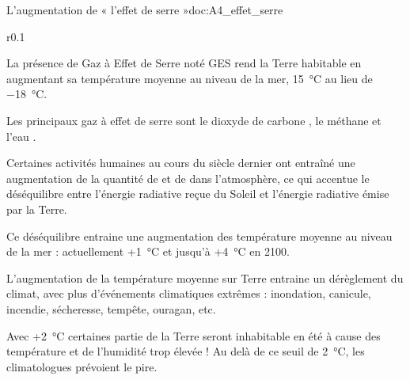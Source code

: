 \begin{doc}{L'augmentation de « l'effet de serre »}{doc:A4_effet_serre}
  \begin{wrapfigure}[3]{r}{0.1\linewidth}
    \vspace*{-18pt}
  \end{wrapfigure}
  La présence de Gaz à Effet de Serre noté GES rend la Terre habitable en augmentant sa température moyenne au niveau de la mer, \qty{15}{\degreeCelsius} au lieu de \qty{-18}{\degreeCelsius}.

  \begin{importants}  
    Les principaux gaz à effet de serre sont le dioxyde de carbone ,
    le méthane  et l'eau .
  \end{importants}

  Certaines activités humaines au cours du siècle dernier ont entraîné une augmentation de la quantité de  et de  dans l'atmosphère, ce qui accentue le déséquilibre entre l'énergie radiative reçue du Soleil et l'énergie radiative émise par la Terre.

  Ce déséquilibre entraine une augmentation des température moyenne au niveau de la mer : actuellement +\qty{1}{\degreeCelsius} et jusqu'à +\qty{4}{\degreeCelsius} en 2100.

  \begin{importants}
    L'augmentation de la température moyenne sur Terre entraine un dérèglement du climat, avec plus d'événements climatiques extrêmes : inondation, canicule, incendie, sécheresse, tempête, ouragan, etc.
  \end{importants}

  Avec +\qty{2}{\degreeCelsius} certaines partie de la Terre seront inhabitable en été à cause des température et de l'humidité trop élevée ! 
  Au delà de ce seuil de \qty{2}{\degreeCelsius}, les climatologues prévoient le pire.
\end{doc}


